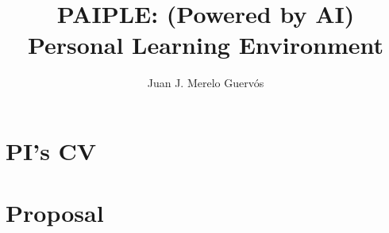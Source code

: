 \documentclass[a4paper]{article}
\title{PAIPLE: (Powered by AI) Personal Learning Environment}
\author{Juan J. Merelo Guervós}
\date{}
\begin{document}
\maketitle

\section{PI's CV}

\section{Proposal}



\end{document}
